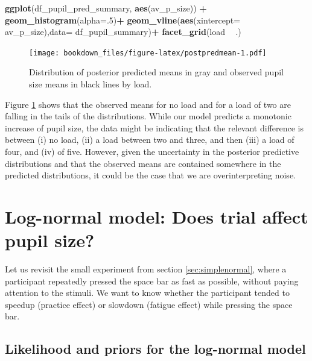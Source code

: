 \documentclass[12pt,]{krantz}
\newenvironment{Shaded}{\begin{snugshade}}{\end{snugshade}}
\newcommand{\DataTypeTok}[1]{\textcolor[rgb]{0.13,0.29,0.53}{#1}}
\newcommand{\DecValTok}[1]{\textcolor[rgb]{0.00,0.00,0.81}{#1}}
\newcommand{\KeywordTok}[1]{\textcolor[rgb]{0.13,0.29,0.53}{\textbf{#1}}}
\newcommand{\NormalTok}[1]{#1}
\newcommand{\OperatorTok}[1]{\textcolor[rgb]{0.81,0.36,0.00}{\textbf{#1}}}
\newcommand{\StringTok}[1]{\textcolor[rgb]{0.31,0.60,0.02}{#1}}
\theoremstyle{definition}
\theoremstyle{definition}
\theoremstyle{definition}
\theoremstyle{remark}
\begin{document}
\begin{Shaded}
\begin{Highlighting}[]
\KeywordTok{ggplot}\NormalTok{(df_pupil_pred_summary, }\KeywordTok{aes}\NormalTok{(av_p_size)) }\OperatorTok{+}
\StringTok{    }\KeywordTok{geom_histogram}\NormalTok{(}\DataTypeTok{alpha=}\NormalTok{.}\DecValTok{5}\NormalTok{)}\OperatorTok{+}
\StringTok{    }\KeywordTok{geom_vline}\NormalTok{(}\KeywordTok{aes}\NormalTok{(}\DataTypeTok{xintercept=}\NormalTok{ av_p_size),}\DataTypeTok{data=}\NormalTok{ df_pupil_summary)}\OperatorTok{+}
\StringTok{    }\KeywordTok{facet_grid}\NormalTok{(load }\OperatorTok{~}\StringTok{ }\NormalTok{.)}
\end{Highlighting}
\end{Shaded}

\begin{figure}
\centering
\texttt{[image: bookdown\_files/figure-latex/postpredmean-1.pdf]}
\caption{\label{fig:postpredmean}Distribution of posterior predicted means in gray and observed pupil size means in black lines by load.}
\end{figure}

Figure \ref{fig:postpredmean} shows that the observed means for no load and for a load of two are falling in the tails of the distributions. While our model predicts a monotonic increase of pupil size, the data might be indicating that the relevant difference is between (i) no load, (ii) a load between two and three, and then (iii) a load of four, and (iv) of five. However, given the uncertainty in the posterior predictive distributions and that the observed means are contained somewhere in the predicted distributions, it could be the case that we are overinterpreting noise.

\hypertarget{sec:trial}{%
\section{Log-normal model: Does trial affect pupil size?}\label{sec:trial}}

Let us revisit the small experiment from section \ref{sec:simplenormal}, where a participant repeatedly pressed the space bar as fast as possible, without paying attention to the stimuli. We want to know whether the participant tended to speedup (practice effect) or slowdown (fatigue effect) while pressing the space bar.

\hypertarget{likelihood-and-priors-for-the-log-normal-model}{%
\subsection{Likelihood and priors for the log-normal model}\label{likelihood-and-priors-for-the-log-normal-model}}
\end{document}
